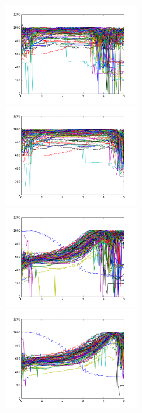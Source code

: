 \documentclass[a4paper, 11pt]{article} %
\begin{document}
\begin{figure}[H]
\begin{minipage}{0.5\linewidth}
\centerline{\includegraphics[width=6.0cm]{figure/originf0_1.png}}
\end{minipage}
\hfill
\begin{minipage}{0.5\linewidth}
\centerline{\includegraphics[width=6.0cm]{figure/exclude_1.png}}
\end{minipage}
\vfill
\begin{minipage}{0.5\linewidth}
\centerline{\includegraphics[width=6.0cm]{figure/originf0_2.png}}
\end{minipage}
\hfill
\begin{minipage}{0.5\linewidth}
\centerline{\includegraphics[width=6.0cm]{figure/exclude_2.png}}

\end{minipage}
\end{figure}
\end{document}
